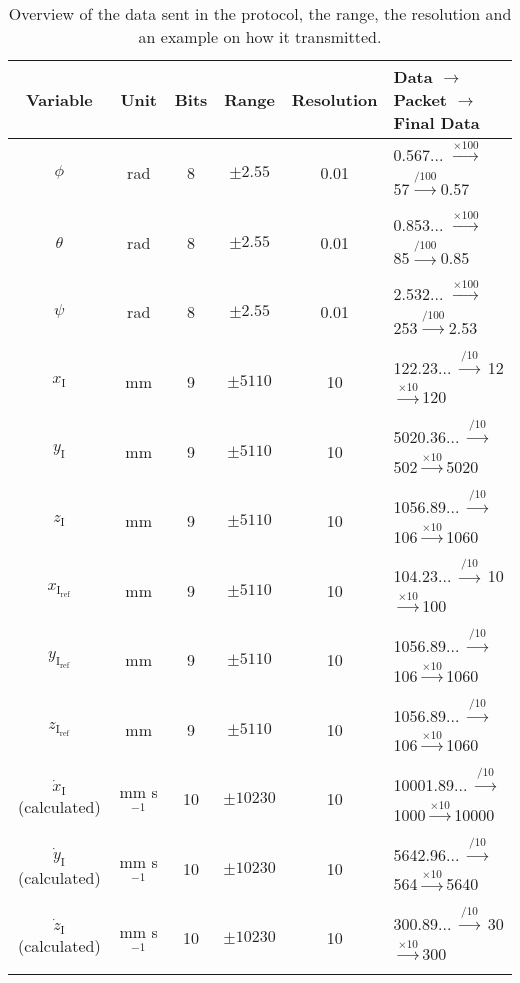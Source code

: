 \begin{table}[H]
    \centering
    \begin{tabular}{|c|c|c|c|c|l|}
        \hline
        Variable      &  Unit       &  Bits     & Range 	   & Resolution 	  & Data $\rightarrow$ Packet $\rightarrow$ Final Data		 \\ \hline
        $\phi$         & rad	 &	8    & $\pm 2.55$ & 0.01 & 0.567... $\xrightarrow[]{\times 100}$ 57$\xrightarrow[]{/ 100}$0.57\\ \hline
        $\theta$       & rad	&	8    & $\pm 2.55$ & 0.01 & 0.853... $\xrightarrow[]{\times 100}$ 85$\xrightarrow[]{/ 100}$0.85\\ \hline
        $\psi$         & rad	&	8    & $\pm 2.55$ & 0.01 & 2.532... $\xrightarrow[]{\times 100}$ 253$\xrightarrow[]{/ 100}$2.53\\ \hline
        $x_{\mathrm{I}}$         & mm	&  9  & $\pm 5110$ & 10  & 122.23... $\xrightarrow[]{/ 10}$ 12$\xrightarrow[]{\times 10}$120\\ \hline
        $y_{\mathrm{I}}$         & mm	&9	    & $\pm 5110$ & 10 & 5020.36... $\xrightarrow[]{/ 10}$ 502$\xrightarrow[]{\times 10}$5020\\ \hline
        $z_{\mathrm{I}}$         & mm	&   9     & $\pm 5110$ & 10 & 1056.89... $\xrightarrow[]{/ 10}$ 106$\xrightarrow[]{\times 10}$1060\\ \hline
        $x_{\mathrm{I_{ref}}}$     & mm	&9	    & $\pm 5110$ & 10 & 104.23... $\xrightarrow[]{/ 10}$ 10$\xrightarrow[]{\times 10}$100\\ \hline
        $y_{\mathrm{I_{ref}}}$     & mm	& 9   & $\pm 5110$ & 10 &  1056.89... $\xrightarrow[]{/ 10}$ 106$\xrightarrow[]{\times 10}$1060\\ \hline
        $z_{\mathrm{I_{ref}}}$     & mm 	&9	    & $\pm 5110$ & 10 & 1056.89... $\xrightarrow[]{/ 10}$ 106$\xrightarrow[]{\times 10}$1060\\ \hline
        $\dot{x}_{\mathrm{I}}$ (calculated)  & mm s$^{-1}$		 &  10 & $\pm 10230$ & 10 & 10001.89... $\xrightarrow[]{/ 10}$ 1000$\xrightarrow[]{\times 10}$10000\\ \hline
        $\dot{y}_{\mathrm{I}}$ (calculated)  & 	mm s$^{-1}$	&  10  & $\pm 10230$ & 10 & 5642.96... $\xrightarrow[]{/ 10}$ 564$\xrightarrow[]{\times 10}$5640\\ \hline
        $\dot{z}_{\mathrm{I}}$ (calculated)  & 	mm s$^{-1}$	&  10  & $\pm 10230$ & 10 & 300.89... $\xrightarrow[]{/ 10}$ 30$\xrightarrow[]{\times 10}$300\\ \hline        
    \end{tabular}
    \caption{Overview of the data sent in the protocol, the range, the resolution and an example on how it transmitted.}
    \label{tab:data}
\end{table}

